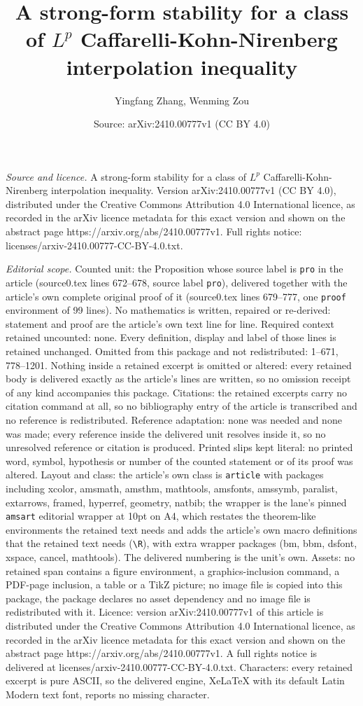 \documentclass[10pt,a4paper]{amsart}
\title[A strong-form stability for a class of $L^p$ Caffarelli-Kohn]{A strong-form stability for a class of $L^p$ Caffarelli-Kohn-Nirenberg interpolation inequality}
\author{Yingfang Zhang, Wenming Zou}
\date{Source: arXiv:2410.00777v1 (CC BY 4.0)}
\begin{document}
\maketitle

\noindent\emph{Source and licence.} A strong-form stability for a class of $L^p$ Caffarelli-Kohn-Nirenberg interpolation inequality. Version arXiv:2410.00777v1 (CC BY 4.0), distributed under the Creative Commons Attribution 4.0 International licence, as recorded in the arXiv licence metadata for this exact version and shown on the abstract page https://arxiv.org/abs/2410.00777v1. Full rights notice: licenses/arxiv-2410.00777-CC-BY-4.0.txt.\par\smallskip

\noindent\textit{Editorial scope.} Counted unit: the Proposition whose source label is \texttt{pro} in the article (source0.tex lines 672--678, source label \texttt{pro}), delivered together with the article's own complete original proof of it (source0.tex lines 679--777, one \texttt{proof} environment of 99 lines). No mathematics is written, repaired or re-derived: statement and proof are the article's own text line for line. Required context retained uncounted: none. Every definition, display and label of those lines is retained unchanged. Omitted from this package and not redistributed: 1--671, 778--1201. Nothing inside a retained excerpt is omitted or altered: every retained body is delivered exactly as the article's lines are written, so no omission receipt of any kind accompanies this package. Citations: the retained excerpts carry no citation command at all, so no bibliography entry of the article is transcribed and no reference is redistributed. Reference adaptation: none was needed and none was made; every reference inside the delivered unit resolves inside it, so no unresolved reference or citation is produced. Printed slips kept literal: no printed word, symbol, hypothesis or number of the counted statement or of its proof was altered. Layout and class: the article's own class is \texttt{article} with packages including xcolor, amsmath, amsthm, mathtools, amsfonts, amssymb, paralist, extarrows, framed, hyperref, geometry, natbib; the wrapper is the lane's pinned \texttt{amsart} editorial wrapper at 10pt on A4, which restates the theorem-like environments the retained text needs and adds the article's own macro definitions that the retained text needs (\texttt{\textbackslash R}), with extra wrapper packages (bm, bbm, dsfont, xspace, cancel, mathtools). The delivered numbering is the unit's own. Assets: no retained span contains a figure environment, a graphics-inclusion command, a PDF-page inclusion, a table or a TikZ picture; no image file is copied into this package, the package declares no asset dependency and no image file is redistributed with it. Licence: version arXiv:2410.00777v1 of this article is distributed under the Creative Commons Attribution 4.0 International licence, as recorded in the arXiv licence metadata for this exact version and shown on the abstract page https://arxiv.org/abs/2410.00777v1. A full rights notice is delivered at licenses/arxiv-2410.00777-CC-BY-4.0.txt. Characters: every retained excerpt is pure ASCII, so the delivered engine, XeLaTeX with its default Latin Modern text font, reports no missing character.
\end{document}
